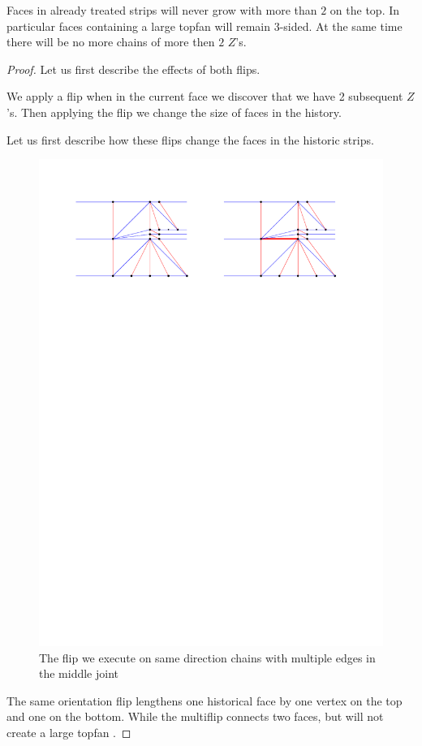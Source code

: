   \begin{lemma}
    \label{lm:}
    Faces in already treated strips will never grow with more than $2$ on the top. In particular faces containing a large topfan will remain 3-sided. At the same time there will be no more chains of more then $2$ $Z$'s.
  \end{lemma}

  \begin{proof}
    Let us first describe the effects of both flips.

    We apply a flip when in the current face we discover that we have 2 subsequent $Z$'s. Then applying the flip we change the size of faces in the history. 

    Let us first describe how these flips change the faces in the historic strips.
    \begin{figure}[h]
      \centering
      \includegraphics[width =\textwidth]{unifiedAlgo/img/post/sameMultiFlip}
      \caption{The flip we execute on same direction chains with multiple edges in the middle joint}
      \label{fig:uni:sameMultiFlip}
    \end{figure}
    The same orientation flip lengthens one historical face by one vertex on the top and one on the bottom. While the multiflip connects two faces, but will not create a large topfan .


\end{proof}
